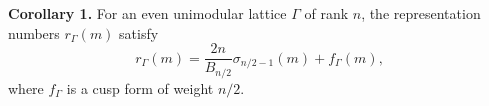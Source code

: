 \textbf{Corollary 1.} For an even unimodular lattice $\Gamma$ of rank $n$, the representation numbers $r_\Gamma(m)$ satisfy
$$r_\Gamma(m) = \frac{2n}{B_{n/2}} \sigma_{n/2-1}(m) + f_\Gamma(m),$$
where $f_\Gamma$ is a cusp form of weight $n/2$.

